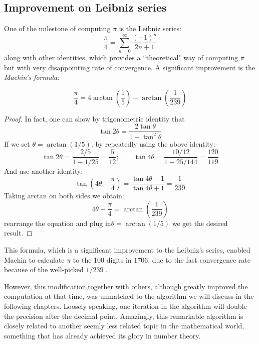 \documentclass{report}
\begin{document}
\begin{titlepage}
\section{Improvement on Leibniz series\hfill}
One of the milestone of computing $\pi$ is the Leibniz series:
\[
\frac{\pi}{4}=\sum_{n=0}^{\infty}\frac{(-1)^n}{2n+1}
\]
along with other identities, which provides a ``theoretical" way of computing $\pi$ but with very disappointing rate of convergence\cite{Borwein:1987aa}. A significant improvement is the {\it Machin's formula}:
\begin{T}
\[
\frac{\pi}{4}=4\arctan\left(\frac{1}{5}\right)-\arctan\left(\frac{1}{239}\right)
\]
\end{T}
\begin{proof}%
In fact, one can show by  trigonometric identity that
\[
\tan2\theta=\frac{2\tan\theta}{1-\tan^2\theta}
\]
If we set $\theta=\arctan(1/5)$, by repeatedly using the above identity:
\[
\tan2\theta=\frac{2/5}{1-1/25}=\frac{5}{12};\qquad\tan4\theta=\frac{10/12}{1-25/144}=\frac{120}{119}
\]
And use another identity:
\[
\tan(4\theta-\frac{\pi}{4})=\frac{\tan4\theta-1}{\tan4\theta+1}=\frac{1}{239}
\]
Taking arctan on both sides we obtain:
\[
4\theta-\frac{\pi}{4}=\arctan\left(\frac{1}{239}\right)
\]
rearrange the equation and plug in$\theta=\arctan(1/5)$ we get the desired result.
\end{proof}
This formula, which is a significant improvement to the Leibniz's series, enabled Machin to calculate $\pi$ to the 100 digits in 1706, due to the fast convergence rate because of the well-picked $1/239$ \cite{Borwein:1987aa}. \medskip

However, this modification,together with others,  although  greatly improved the computation at that time, was unmatched to the algorithm we will discuss in the following chapters. Loosely speaking, one iteration in the algorithm will double the precision after the decimal point\cite{Borwein:1987aa}. Amazingly, this remarkable algorithm is closely related to another seemly less related topic in the mathematical world,  something that has already achieved its glory in number theory.
\eject





\end{titlepage}
\end{document}
